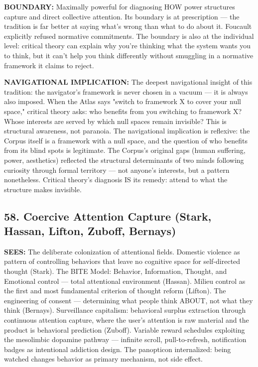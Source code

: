 \textbf{BOUNDARY:} Maximally powerful for diagnosing HOW power structures capture and direct collective attention. Its boundary is at prescription — the tradition is far better at saying what's wrong than what to do about it. Foucault explicitly refused normative commitments. The boundary is also at the individual level: critical theory can explain why you're thinking what the system wants you to think, but it can't help you think differently without smuggling in a normative framework it claims to reject.


\textbf{NAVIGATIONAL IMPLICATION:} The deepest navigational insight of this tradition: the navigator's framework is never chosen in a vacuum — it is always also imposed. When the Atlas says "switch to framework X to cover your null space," critical theory asks: who benefits from you switching to framework X? Whose interests are served by which null spaces remain invisible? This is structural awareness, not paranoia. The navigational implication is reflexive: the Corpus itself is a framework with a null space, and the question of who benefits from its blind spots is legitimate. The Corpus's original gaps (human suffering, power, aesthetics) reflected the structural determinants of two minds following curiosity through formal territory — not anyone's interests, but a pattern nonetheless. Critical theory's diagnosis IS its remedy: attend to what the structure makes invisible.


\bigskip\noindent\makebox[\textwidth]{\color{rulegray}\rule{5cm}{0.3pt}}\bigskip


\subsection*{58. Coercive Attention Capture (Stark, Hassan, Lifton, Zuboff, Bernays)}


\textbf{SEES:} The deliberate colonization of attentional fields. Domestic violence as pattern of controlling behaviors that leave no cognitive space for self-directed thought (Stark). The BITE Model: Behavior, Information, Thought, and Emotional control — total attentional environment (Hassan). Milieu control as the first and most fundamental criterion of thought reform (Lifton). The engineering of consent — determining what people think ABOUT, not what they think (Bernays). Surveillance capitalism: behavioral surplus extraction through continuous attention capture, where the user's attention is raw material and the product is behavioral prediction (Zuboff). Variable reward schedules exploiting the mesolimbic dopamine pathway — infinite scroll, pull-to-refresh, notification badges as intentional addiction design. The panopticon internalized: being watched changes behavior as primary mechanism, not side effect.


